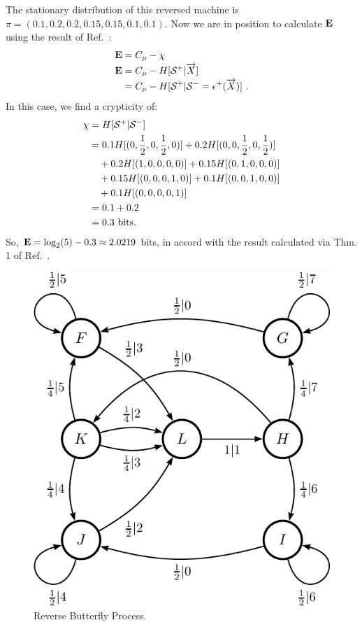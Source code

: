 The stationary distribution of this reversed machine is
$\pi = (0.1, 0.2, 0.2, 0.15, 0.15, 0.1, 0.1)$. Now we are in position
to calculate ${\bf E}$ using the result of Ref.~\cite{Crut08a}:
\begin{align}
{\bf E} &= C_\mu - \chi \\
{\bf E} &= C_\mu - H[{\mathcal{S}}^{+} | \smash{\overrightarrow{{X}}}] \\
    &= C_\mu - H[{\mathcal{S}}^{+} | {\mathcal{S}}^{-} =
	\epsilon^{+}(\smash{\overrightarrow{{X}}})] ~.
\end{align}
In this case, we find a crypticity of:
\begin{align*}
  \chi & = H[{\mathcal{S}}^{+} | {\mathcal{S}}^{-}] \\
    & =  0.1 H[(0,\frac{1}{2},0,\frac{1}{2},0)]
		+ 0.2 H[(0,0,\frac{1}{2},0,\frac{1}{2})] \\
	& \quad + 0.2 H[(1,0,0,0,0)]
		+ 0.15 H[(0,1,0,0,0)] \\
	& \quad + 0.15 H[(0,0,0,1,0)]
		+ 0.1 H[(0,0,1,0,0)] \\
	& \quad + 0.1 H[(0,0,0,0,1)] \\
    & = 0.1 + 0.2 \\
	& = 0.3 ~\mathrm{bits}.
\end{align*}
So, ${\bf E} = \log_2 (5) - 0.3 \approx 2.0219$ bits, in accord with the result
calculated via Thm. 1 of Ref.~\cite{Maho09a}.

\begin{figure}[th]
\centering
\includegraphics{../chapter4/figures/butterfly_reM_ur}
\caption{Reverse Butterfly Process.
  }
\label{fig:ReverseButterflyProcess}
\end{figure}

